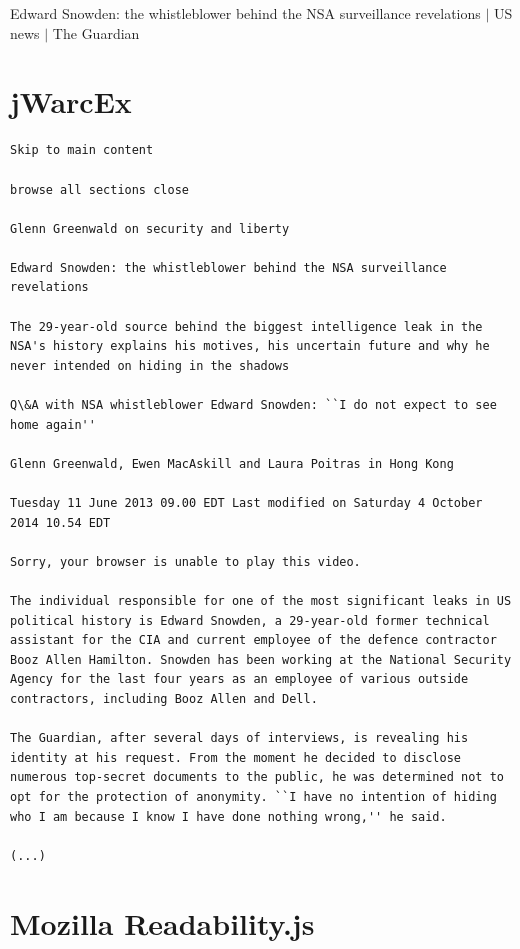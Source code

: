 \documentclass[a4paper,12pt,titlepage=false]{scrreprt}
\begin{document}
\scriptsize
Edward Snowden: the whistleblower behind the NSA surveillance revelations $|$ US news $|$ The Guardian

\section{jWarcEx}

\begin{lstlisting}[breaklines=true]
Skip to main content

browse all sections close

Glenn Greenwald on security and liberty

Edward Snowden: the whistleblower behind the NSA surveillance revelations

The 29-year-old source behind the biggest intelligence leak in the NSA's history explains his motives, his uncertain future and why he never intended on hiding in the shadows

Q\&A with NSA whistleblower Edward Snowden: ``I do not expect to see home again''

Glenn Greenwald, Ewen MacAskill and Laura Poitras in Hong Kong

Tuesday 11 June 2013 09.00 EDT Last modified on Saturday 4 October 2014 10.54 EDT

Sorry, your browser is unable to play this video.

The individual responsible for one of the most significant leaks in US political history is Edward Snowden, a 29-year-old former technical assistant for the CIA and current employee of the defence contractor Booz Allen Hamilton. Snowden has been working at the National Security Agency for the last four years as an employee of various outside contractors, including Booz Allen and Dell.

The Guardian, after several days of interviews, is revealing his identity at his request. From the moment he decided to disclose numerous top-secret documents to the public, he was determined not to opt for the protection of anonymity. ``I have no intention of hiding who I am because I know I have done nothing wrong,'' he said.

(...)
\end{lstlisting}

\section{Mozilla Readability.js}
\end{document}

